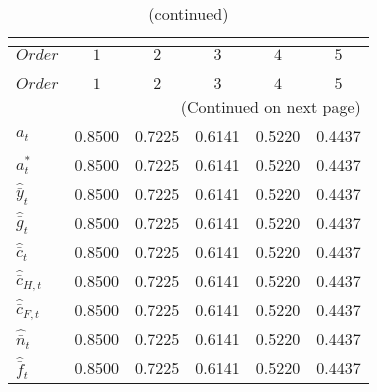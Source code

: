  
\begin{center}
\begin{longtable}{lccccc} 
\caption{COEFFICIENTS OF AUTOCORRELATION}\\
 \label{Table:th_autocorr_matrix}\\
\toprule 
$Order                    $	 & 	 $                 1$	 & 	 $                 2$	 & 	 $                 3$	 & 	 $                 4$	 & 	 $                 5$\\
\midrule \endfirsthead 
\caption{(continued)}\\
 \toprule \\ 
$Order                    $	 & 	 $                 1$	 & 	 $                 2$	 & 	 $                 3$	 & 	 $                 4$	 & 	 $                 5$\\
\midrule \endhead 
\midrule \multicolumn{6}{r}{(Continued on next page)} \\ \bottomrule \endfoot 
\bottomrule \endlastfoot 
${a_t}                    $	 & 	            0.8500	 & 	            0.7225	 & 	            0.6141	 & 	            0.5220	 & 	            0.4437 \\ 
${a_t^*}                  $	 & 	            0.8500	 & 	            0.7225	 & 	            0.6141	 & 	            0.5220	 & 	            0.4437 \\ 
${\hat {\bar y}_t}        $	 & 	            0.8500	 & 	            0.7225	 & 	            0.6141	 & 	            0.5220	 & 	            0.4437 \\ 
${\hat {\bar g}_t}        $	 & 	            0.8500	 & 	            0.7225	 & 	            0.6141	 & 	            0.5220	 & 	            0.4437 \\ 
${\hat {\bar c}_t}        $	 & 	            0.8500	 & 	            0.7225	 & 	            0.6141	 & 	            0.5220	 & 	            0.4437 \\ 
${\hat {\bar c}_{H,t}}    $	 & 	            0.8500	 & 	            0.7225	 & 	            0.6141	 & 	            0.5220	 & 	            0.4437 \\ 
${\hat {\bar c}_{F,t}}    $	 & 	            0.8500	 & 	            0.7225	 & 	            0.6141	 & 	            0.5220	 & 	            0.4437 \\ 
${\hat {\bar n}_t}        $	 & 	            0.8500	 & 	            0.7225	 & 	            0.6141	 & 	            0.5220	 & 	            0.4437 \\ 
${\hat {\bar f}_t}        $	 & 	            0.8500	 & 	            0.7225	 & 	            0.6141	 & 	            0.5220	 & 	            0.4437 \\ 

\end{longtable}
\end{center}
